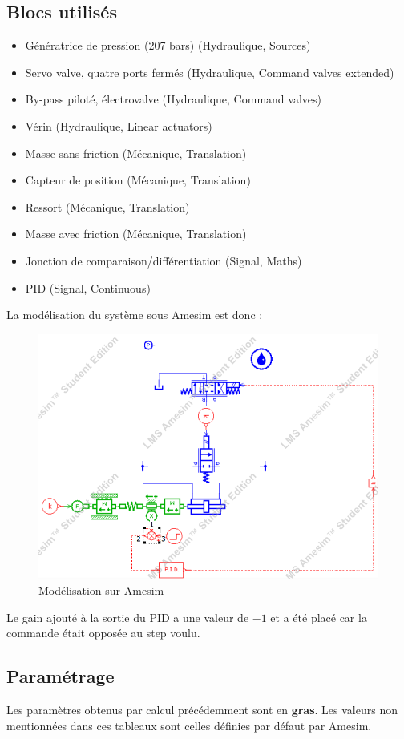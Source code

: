 \documentclass[a4paper,12pt,calibri,oneside,openany]{book}
\theoremstyle{break}
\begin{document}
\subsection{Blocs utilisés}
\begin{itemize}
	\itemsep0em
	\item Génératrice de pression (207 bars) (Hydraulique, Sources)
	\item Servo valve, quatre ports fermés (Hydraulique, Command valves extended)
	\item By-pass piloté, électrovalve (Hydraulique, Command valves)
	\item Vérin (Hydraulique, Linear actuators)
	\item Masse sans friction (Mécanique, Translation)
	\item Capteur de position (Mécanique, Translation)
	\item Ressort (Mécanique, Translation)
	\item Masse avec friction (Mécanique, Translation)
	\item Jonction de comparaison/différentiation (Signal, Maths)
	\item PID (Signal, Continuous)
\end{itemize}
\clearpage
La modélisation du système sous Amesim est donc : 
\begin{figure}[H]
	\centering \includegraphics[width=\linewidth]{systemamesim}
	\caption{Modélisation sur Amesim}
\end{figure}
Le gain ajouté à la sortie du PID a une valeur de $-1$ et a été placé car la commande était opposée au step voulu. 
\clearpage
\subsection{Paramétrage}
Les paramètres obtenus par calcul précédemment sont en \textbf{gras}. Les valeurs non mentionnées dans ces tableaux sont celles définies par défaut par Amesim.
\end{document}
